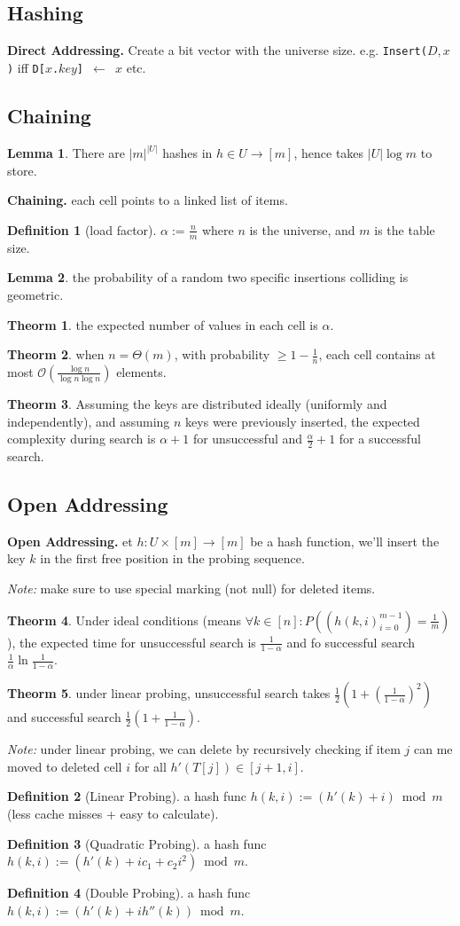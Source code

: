 \documentclass[]{article}
\newcommand\compactsubsection[1]        {\vspace{-10pt}\subsection{#1}\vspace{-5pt}}
\newcommand\compactsection   [1]        {\vspace{-10pt}\section{#1}\vspace{-5pt}}
\newcommand\subsectionrightaftersection {\vspace{10pt}}
\theoremstyle{definition}
\newtheorem{Theorem}{\color{theoColor}Theorm}
\newtheorem{Definition}{\color{defiColor}Definition}
\newtheorem{Lemma}{\color{lemColor}Lemma}
\newcommand\theo  [1] {\begin{Theorem}#1\end{Theorem}}
\newcommand\lem   [1] {\begin{Lemma}#1\end{Lemma}}
\newcommand\oc    {\mathcal{O}}
\newcommand\set   {\ell et \text{ }}
\newcommand\co        {\colon}
\newcommand\ag        {\alpha}
\newcommand\logn      {\log n}
\newcommand\cl [1]    {\left ( #1 \right )}
\begin{document}
\begin{multicols}{4}
		
		\compactsection{Hashing}\subsectionrightaftersection
			\textbf{Direct Addressing. }Create a bit vector with the universe size. e.g. \texttt{Insert($D, x$)} iff \texttt{D[$x$.$key$] $\gets$ $x$} etc. 
			\compactsubsection{Chaining}
				\lem{There are $|m|^{|U|}$ hashes in $h \in U \to [m]$, hence takes $|U|\log m$ to store. }
				\textbf{Chaining. }each cell points to a linked list of items. 
				\begin{Definition}[load factor]
					$\ag := \frac{n}{m}$ where $n$ is the universe, and $m$ is the table size. 
				\end{Definition}
				\lem{the probability of a random two specific insertions colliding is geometric. }
				\theo{the expected number of values in each cell is $\ag$. }
				\theo{when $n = \Theta(m)$, with probability $\ge 1 - \frac{1}{n}$, each cell contains at most $\oc\cl{\frac{\logn}{\logn\logn}}$ elements. }
				\theo{Assuming the keys are distributed ideally (uniformly and independently), and assuming $n$ keys were previously inserted, the expected complexity during search is $\ag + 1$ for unsuccessful and $\frac{\ag}{2} + 1$ for a successful search. }
			
			\compactsubsection{Open Addressing}
				\textbf{Open Addressing. }\set $h \co U \times [m] \to [m]$ be a hash function, we'll insert the key $k$ in the first free position in the probing sequence. 
				
				\textit{Note: }make sure to use special marking (not null) for deleted items.  
				
				\theo{Under ideal conditions (means $\forall k \in [n] \co P\cl{(h(k, i)_{i = 0}^{m - 1}) = \frac{1}{m}}$), the expected time for unsuccessful search is $\frac{1}{1 - \ag}$ and fo successful search $\frac{1}{\ag} \ln \frac{1}{1 - \ag}$. } 
				
				\theo{under linear probing, unsuccessful search takes $\frac{1}{2}\cl{1 + \cl{\frac{1}{1 - \ag}}^2}$ and successful search $\frac{1}{2}\cl{1 + \frac{1}{1 - \ag}}$. }
				\textit{Note: }under linear probing, we can delete by recursively checking if item $j$ can me moved to deleted cell $i$ for all $h'(T[j]) \in [j + 1, i]$. 
				
				\begin{Definition}[Linear Probing]
				 	a hash func $h(k, i) := (h'(k) + i) \bmod m$ (less cache misses + easy to calculate). 
				\end{Definition}
				\begin{Definition}[Quadratic Probing]
					a hash func $h(k, i) := (h'(k) + ic_1 + c_2i^2) \bmod m$. 
				\end{Definition}
				\begin{Definition}[Double Probing]
					a hash func $h(k, i) := (h'(k) + ih''(k)) \bmod m$. 
				\end{Definition}
			

\end{multicols}
\end{document}
